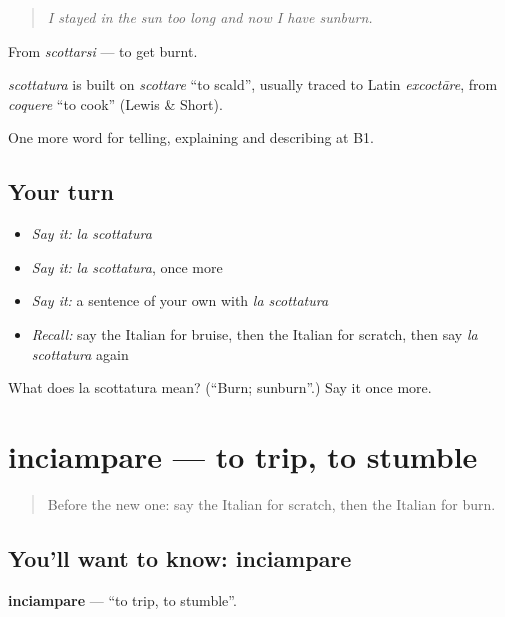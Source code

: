 \begin{quote}
\emph{I stayed in the sun too long and now I have sunburn.}
\end{quote}

From \emph{scottarsi} — to get burnt.

\begin{cousinweb}
\emph{scottatura} is built on \emph{scottare} \textquotedblleft{}to scald\textquotedblright{}, usually traced to Latin \emph{excoctāre}, from \emph{coquere} \textquotedblleft{}to cook\textquotedblright{} (Lewis \& Short).
\end{cousinweb}

\begin{grammarlens}[title={What you've built}]
One more word for telling, explaining and describing at B1.
\end{grammarlens}

\subsection*{Your turn}
\begin{itemize}
\raggedright
  \item \emph{Say it:} \emph{la scottatura}
  \item \emph{Say it:} \emph{la scottatura}, once more
  \item \emph{Say it:} a sentence of your own with \emph{la scottatura}
  \item \emph{Recall:} say the Italian for bruise, then the Italian for scratch, then say \emph{la scottatura} again
\end{itemize}

\begin{tcolorbox}[breakable,colback=teal!4,colframe=teal!35!black,title={Before you move on}]
What does la scottatura mean? (\textquotedblleft{}Burn; sunburn\textquotedblright{}.) Say it once more.
\end{tcolorbox}
\section[inciampare]{inciampare — to trip, to stumble}

\label{lesson:IT-C483-inciampare}



\begin{quote}
Before the new one: say the Italian for scratch, then the Italian for burn.
\end{quote}

\subsection*{You'll want to know: inciampare}
\textbf{inciampare} — \textquotedblleft{}to trip, to stumble\textquotedblright{}.

